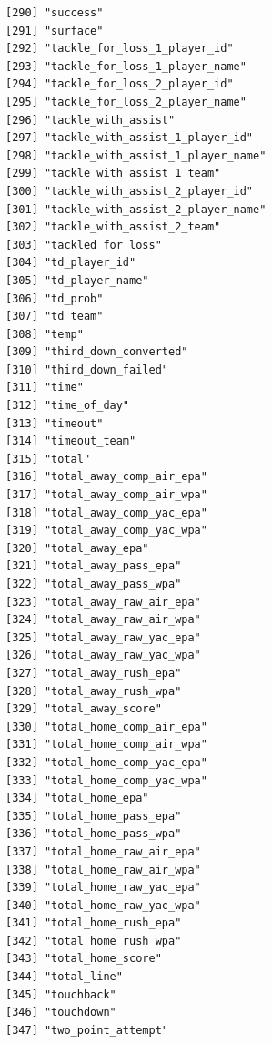 \documentclass[
  letterpaper,
]{krantz}
\begin{document}
\begin{verbatim}
[290] "success"                             
[291] "surface"                             
[292] "tackle_for_loss_1_player_id"         
[293] "tackle_for_loss_1_player_name"       
[294] "tackle_for_loss_2_player_id"         
[295] "tackle_for_loss_2_player_name"       
[296] "tackle_with_assist"                  
[297] "tackle_with_assist_1_player_id"      
[298] "tackle_with_assist_1_player_name"    
[299] "tackle_with_assist_1_team"           
[300] "tackle_with_assist_2_player_id"      
[301] "tackle_with_assist_2_player_name"    
[302] "tackle_with_assist_2_team"           
[303] "tackled_for_loss"                    
[304] "td_player_id"                        
[305] "td_player_name"                      
[306] "td_prob"                             
[307] "td_team"                             
[308] "temp"                                
[309] "third_down_converted"                
[310] "third_down_failed"                   
[311] "time"                                
[312] "time_of_day"                         
[313] "timeout"                             
[314] "timeout_team"                        
[315] "total"                               
[316] "total_away_comp_air_epa"             
[317] "total_away_comp_air_wpa"             
[318] "total_away_comp_yac_epa"             
[319] "total_away_comp_yac_wpa"             
[320] "total_away_epa"                      
[321] "total_away_pass_epa"                 
[322] "total_away_pass_wpa"                 
[323] "total_away_raw_air_epa"              
[324] "total_away_raw_air_wpa"              
[325] "total_away_raw_yac_epa"              
[326] "total_away_raw_yac_wpa"              
[327] "total_away_rush_epa"                 
[328] "total_away_rush_wpa"                 
[329] "total_away_score"                    
[330] "total_home_comp_air_epa"             
[331] "total_home_comp_air_wpa"             
[332] "total_home_comp_yac_epa"             
[333] "total_home_comp_yac_wpa"             
[334] "total_home_epa"                      
[335] "total_home_pass_epa"                 
[336] "total_home_pass_wpa"                 
[337] "total_home_raw_air_epa"              
[338] "total_home_raw_air_wpa"              
[339] "total_home_raw_yac_epa"              
[340] "total_home_raw_yac_wpa"              
[341] "total_home_rush_epa"                 
[342] "total_home_rush_wpa"                 
[343] "total_home_score"                    
[344] "total_line"                          
[345] "touchback"                           
[346] "touchdown"                           
[347] "two_point_attempt"                   

\end{verbatim}
\end{document}
